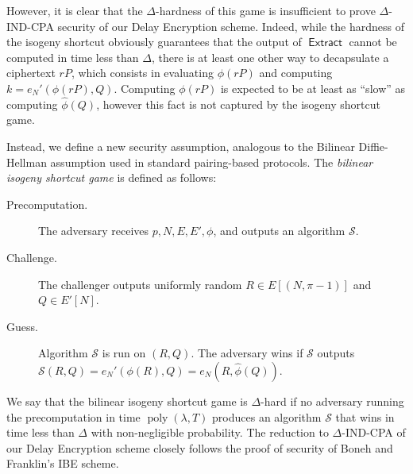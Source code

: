 \documentclass{llncs}
\DeclareMathOperator{\poly}{poly}
\DeclareMathOperator{\Extract}{\mathsf{Extract}}
\begin{document}
However, it is clear that the $\Delta$-hardness of this game is
insufficient to prove $\Delta$-IND-CPA security of our Delay
Encryption scheme. %
Indeed, while the hardness of the isogeny shortcut obviously
guarantees that the output of $\Extract$ cannot be computed in time
less than $\Delta$, there is at least one other way to decapsulate a
ciphertext $rP$, which consists in evaluating $\phi(rP)$ and computing
$k=e_N'(\phi(rP), Q)$. %
Computing $\phi(rP)$ is expected to be at least as ``slow'' as
computing $\hat\phi(Q)$, however this fact is not captured by the
isogeny shortcut game.

Instead, we define a new security assumption, analogous to the
Bilinear Diffie-Hellman assumption used in standard pairing-based
protocols. %
The \emph{bilinear isogeny shortcut game} is defined as follows:

\begin{description}
\item[Precomputation.] The adversary receives $p,N,E,E',\phi$, and
  outputs an algorithm $\mathcal{S}$.
\item[Challenge.] The challenger outputs uniformly random
  $R\in E[(N,\pi-1)]$ and $Q\in E'[N]$.
\item[Guess.] Algorithm $\mathcal{S}$ is run on $(R,Q)$. The adversary
  wins if $\mathcal{S}$ outputs
  $\mathcal{S}(R,Q) = e_N'(\phi(R),Q) = e_N(R,\hat\phi(Q))$.
\end{description}

We say that the bilinear isogeny shortcut game is $\Delta$-hard if no
adversary running the precomputation in time $\poly(\lambda,T)$
produces an algorithm $\mathcal{S}$ that wins in time less than
$\Delta$ with non-negligible probability. %
The reduction to $\Delta$-IND-CPA of our Delay Encryption scheme
closely follows the proof of security of Boneh and Franklin's IBE
scheme.
\end{document}
